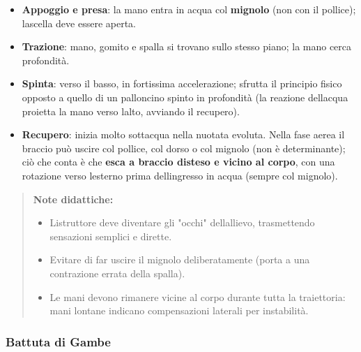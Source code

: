 \documentclass[a4paper,11pt]{article}
\providecommand{\tightlist}{%
  \setlength{\itemsep}{0pt}\setlength{\parskip}{0pt}}
\begin{document}
\begin{itemize}
      \tightlist
      \item
            \textbf{Appoggio e presa}: la mano entra in acqua col \textbf{mignolo}
            (non con il pollice); l\textquotesingle ascella deve essere aperta.
      \item
            \textbf{Trazione}: mano, gomito e spalla si trovano sullo stesso
            piano; la mano cerca profondità.
      \item
            \textbf{Spinta}: verso il basso, in fortissima accelerazione; sfrutta
            il principio fisico opposto a quello di un palloncino spinto in
            profondità (la reazione dell\textquotesingle acqua proietta la mano
            verso l\textquotesingle alto, avviando il recupero).
      \item
            \textbf{Recupero}: inizia molto sott\textquotesingle acqua nella
            nuotata evoluta. Nella fase aerea il braccio può uscire col pollice,
            col dorso o col mignolo (non è determinante); ciò che conta è che
            \textbf{esca a braccio disteso e vicino al corpo}, con una rotazione
            verso l\textquotesingle esterno prima dell\textquotesingle ingresso in
            acqua (sempre col mignolo).
\end{itemize}

\begin{quote}
      \textbf{Note didattiche:}

      \begin{itemize}
            \tightlist
            \item
                  L\textquotesingle istruttore deve diventare gli "occhi"
                  dell\textquotesingle allievo, trasmettendo sensazioni semplici e
                  dirette.
            \item
                  Evitare di far uscire il mignolo deliberatamente (porta a una
                  contrazione errata della spalla).
            \item
                  Le mani devono rimanere vicine al corpo durante tutta la traiettoria:
                  mani lontane indicano compensazioni laterali per instabilità.
      \end{itemize}
\end{quote}

\subsubsection{Battuta di Gambe}\label{battuta-di-gambe-1}
\end{document}
